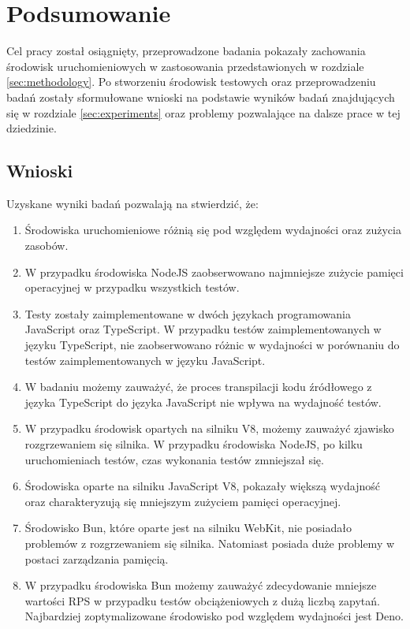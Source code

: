 \section{Podsumowanie}
Cel pracy został osiągnięty, przeprowadzone badania pokazały zachowania środowisk uruchomieniowych w zastosowania przedstawionych w rozdziale \ref{sec:methodology}. Po stworzeniu środowisk testowych oraz przeprowadzeniu badań zostały sformułowane wnioski na podstawie wyników badań znajdujących się w rozdziale \ref{sec:experiments} oraz problemy pozwalające na dalsze prace w tej dziedzinie.

\subsection{Wnioski}
Uzyskane wyniki badań pozwalają na stwierdzić, że:
\begin{enumerate}
  \item Środowiska uruchomieniowe różnią się pod względem wydajności oraz zużycia zasobów. 
  \item W przypadku środowiska NodeJS zaobserwowano najmniejsze zużycie pamięci operacyjnej w przypadku wszystkich testów.
  \item Testy zostały zaimplementowane w dwóch językach programowania JavaScript oraz TypeScript. W przypadku testów zaimplementowanych w języku TypeScript, nie zaobserwowano różnic w wydajności w porównaniu do testów zaimplementowanych w języku JavaScript.
  \item W badaniu możemy zauważyć, że proces transpilacji kodu źródłowego z języka TypeScript do języka JavaScript nie wpływa na wydajność testów.
  \item W przypadku środowisk opartych na silniku V8, możemy zauważyć zjawisko rozgrzewaniem się silnika. W przypadku środowiska NodeJS, po kilku uruchomieniach testów, czas wykonania testów zmniejszał się.
  \item Środowiska oparte na silniku JavaScript V8, pokazały większą wydajność oraz charakteryzują się mniejszym zużyciem pamięci operacyjnej.
  \item Środowisko Bun, które oparte jest na silniku WebKit, nie posiadało problemów z rozgrzewaniem się silnika. Natomiast posiada duże problemy w postaci zarządzania pamięcią.
  \item W przypadku środowiska Bun możemy zauważyć zdecydowanie mniejsze wartości RPS w przypadku testów obciążeniowych z dużą liczbą zapytań. Najbardziej zoptymalizowane środowisko pod względem wydajności jest Deno.
\end{enumerate}

